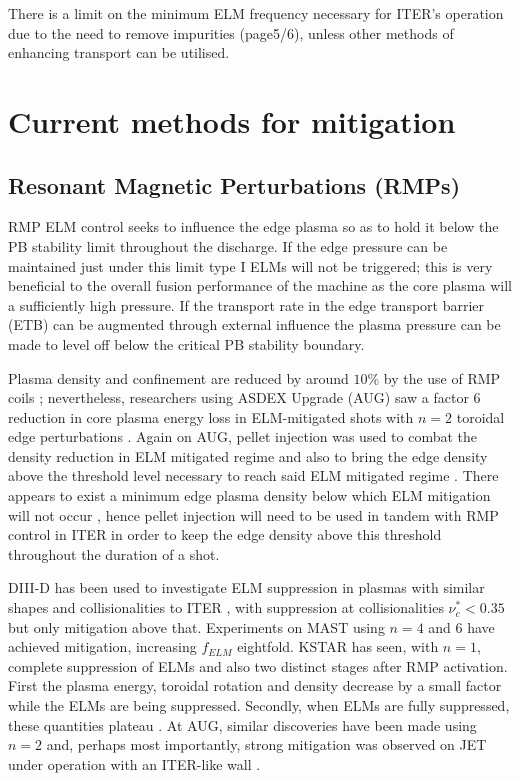 \documentclass[12pt]{article}  %
\begin{document}
There is a limit on the minimum ELM frequency necessary for ITER's operation due to the need to remove impurities (page5/6)\cite{Loarte2014a}, unless other methods of enhancing transport can be utilised.

\section{Current methods for mitigation}\label{sec:Mitigation}

\subsection{Resonant Magnetic Perturbations (RMPs)}\label{ssec:RMP}
RMP ELM control seeks to influence the edge plasma so as to hold it below the PB stability limit throughout the discharge. If the edge pressure can be maintained just under this limit type I ELMs will not be triggered; this is very beneficial to the overall fusion performance of the machine as the core plasma will a sufficiently high pressure. If the transport rate in the edge transport barrier (ETB) can be augmented through external influence the plasma pressure can be made to level off below the critical PB stability boundary. 

Plasma density and confinement are reduced by around $10\%$ by the use of RMP coils \cite{Lang2013}; nevertheless, researchers using ASDEX Upgrade (AUG) saw a factor 6 reduction in core plasma energy loss in ELM-mitigated shots with $n=2$ toroidal edge perturbations \cite{Suttrop2011}. Again on AUG, pellet injection was used to combat the density reduction in ELM mitigated regime and also to bring the edge density above the threshold level necessary to reach said ELM mitigated regime \cite{Lang2012}. There appears to exist a minimum edge plasma density below which ELM mitigation will not occur \cite{Suttrop2011}, hence pellet injection will need to be used in tandem with RMP control in ITER in order to keep the edge density above this threshold throughout the duration of a shot.

DIII-D has been used to investigate ELM suppression in plasmas with similar shapes and collisionalities to ITER \cite{Evans2008,Lanctot2013}, with suppression at collisionalities $\nu_c^* < 0.35$ but only mitigation above that. Experiments on MAST\cite{Kirk2013a} using $n=4 $ and $6$ have achieved mitigation, increasing $f_{ELM}$ eightfold. KSTAR has seen, with $n=1$, complete suppression of ELMs and also two distinct stages after RMP activation. First the plasma energy, toroidal rotation and density decrease by a small factor while the ELMs are being suppressed. Secondly, when ELMs are fully suppressed, these quantities plateau \cite{Kwak2013}. At AUG, similar discoveries have been made using $n=2$ \cite{Fischer2012,Suttrop2011} and, perhaps most importantly, strong mitigation was observed on JET under operation with an ITER-like wall \cite{Liang2013}. 
\end{document}
